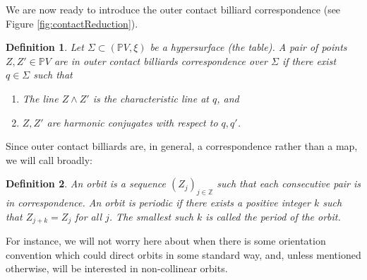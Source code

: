 \documentclass{article}
\newcommand{\Z}{\mathbb{Z}} %
\newtheorem{defi}{Definition}[section]
\begin{document}
We are now ready to introduce the outer contact billiard correspondence (see Figure 
\ref{fig:contactReduction}). \\

\begin{defi}\label{def:OutContBill}
    Let $\Sigma\subset (\mathbb{P}V,\xi)$ be a hypersurface (the {\em table}). A 
    pair of points $Z,Z'\in \mathbb{P}V$ are in {\em outer contact billiards
    correspondence} over $\Sigma$ if there exist $q\in \Sigma$ such that
    \begin{enumerate}
        \item The line $Z\wedge Z'$ is the characteristic line at $q$, and 
        \item $Z,Z'$ are harmonic conjugates with respect to $q, q'$.
    \end{enumerate}
\end{defi}

Since outer contact billiards are, in general, a correspondence rather than a map, we will call broadly:
\begin{defi}\label{def:periodic}
    An {\em orbit} is a sequence $(Z_j)_{j\in \Z}$ such that each consecutive pair is 
    in correspondence. An orbit is {\em periodic} if there exists a positive integer 
    $k$ such that $Z_{j+k}=Z_j$ for all $j$. The smallest such $k$ is called the 
    {\em period} of the orbit.
\end{defi}
For instance, we will not worry here about when there is some orientation convention which could direct orbits in some standard way, and, unless mentioned otherwise, will be interested in non-collinear orbits.
\end{document}
